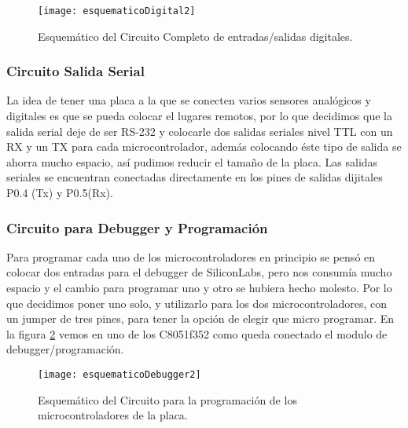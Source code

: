 \begin{figure}  [H]
\centering
  \texttt{[image: esquematicoDigital2]}
  \caption{Esquemático del Circuito Completo de entradas/salidas digitales.}\label{fig:esquematicoDigital2}
\end{figure}



\subsubsection{Circuito Salida Serial}
\label{subsub:salida_serial2}

La idea de tener una placa a la que se conecten varios sensores analógicos y digitales es que se pueda colocar el lugares remotos, por lo que decidimos que la salida serial deje de ser RS-232 y colocarle dos salidas seriales nivel TTL con un RX y un TX para cada microcontrolador, además colocando éste tipo de salida se ahorra mucho espacio, así pudimos reducir el tamaño de la placa. Las salidas seriales se encuentran conectadas directamente en los pines de salidas dijitales P0.4 (Tx) y P0.5(Rx).


\subsubsection{Circuito para Debugger y Programación} %
\label{subsub:debugger_programacion2}

Para programar cada uno de los microcontroladores en principio se pensó en colocar dos entradas para el debugger de SiliconLabs, pero nos consumía mucho espacio y el cambio para programar uno y otro se hubiera hecho molesto. Por lo que decidimos poner uno solo, y utilizarlo para los dos microcontroladores, con un jumper de tres pines, para tener la opción de elegir que micro programar.
En la figura \ref{fig:esquematicoDebugger2} vemos en uno de los C8051f352 como queda conectado el modulo de debugger/programación.

\begin{figure}  [H]
\centering
  \texttt{[image: esquematicoDebugger2]}
  \caption{Esquemático del Circuito para la programación de los microcontroladores de la placa.}\label{fig:esquematicoDebugger2}
\end{figure}



